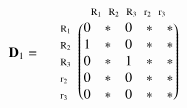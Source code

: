 \documentclass[a4paper,10pt]{article}
\begin{document}
\begin{equation*}
\mathbf{D}_1 = \; \; \; \; \; \begin{matrix}
 & 

\begin{matrix}
\text{\scriptsize $\mathrm{R}_1$} \!\!\! & 
\text{\scriptsize $\mathrm{R}_2$} \!\!\! & 
\text{\scriptsize $\mathrm{R}_3$} \!\!\! & 
\text{\scriptsize $\mathrm{r}_2$} \!\!\! & 
\text{\scriptsize $\mathrm{r}_3$}
\end{matrix}

\\ 

\begin{matrix*}[l]
\text{\scriptsize $\mathrm{R}_1$} \!\!\! \\
\text{\scriptsize $\mathrm{R}_2$} \!\!\! \\
\text{\scriptsize $\mathrm{R}_3$} \!\!\! \\
\text{\scriptsize $\mathrm{r}_2$} \!\!\! \\
\text{\scriptsize $\mathrm{r}_3$} \!\!\!
\end{matrix*}

& 

\begin{pmatrix}
0 & * & 0 & * & * \\
1 & * & 0 & * & * \\
0 & * & 1 & * & * \\
0 & * & 0 & * & * \\
0 & * & 0 & * & *
\end{pmatrix}

\end{matrix}
\end{equation*}

\bigskip
\end{document}
